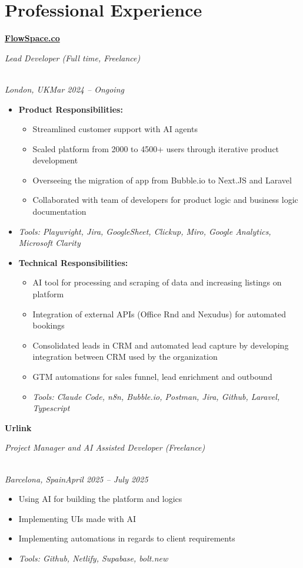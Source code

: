 \documentclass[a4paper,10pt]{article}
\newcommand{\role}[4]{\vspace{3pt}\noindent\hspace{0.6em}\parbox[t]{0.38\textwidth}{\raggedright\textbf{#1}}\hfill\parbox[t]{0.58\textwidth}{\raggedleft\textit{#2}}\\{\textit{#3}\hfill\textit{#4}}\vspace{1pt}}
\begin{document}
\section{Professional Experience}
\role{\href{https://flowspace.co}{FlowSpace.co}}{Lead Developer (Full time, Freelance)}{London, UK}{Mar 2024 -- Ongoing}
\begin{itemize}
\item \textbf{Product Responsibilities:}
\begin{itemize}[label=--]
\item Streamlined customer support with AI agents
\item Scaled platform from 2000 to 4500+ users through iterative product development
\item Overseeing the migration of app from Bubble.io to Next.JS and Laravel
\item Collaborated with team of developers for product logic and business logic documentation
\end{itemize}
\item \textit{Tools: Playwright, Jira, GoogleSheet, Clickup, Miro, Google Analytics, Microsoft Clarity}
\item \textbf{Technical Responsibilities:}
\begin{itemize}[label=--]
\item AI tool for processing and scraping of data and increasing listings on platform
\item Integration of external APIs (Office Rnd and Nexudus) for automated bookings
\item Consolidated leads in CRM and automated lead capture by developing integration between CRM used by the organization
\item GTM automations for sales funnel, lead enrichment and outbound
\item \textit{Tools: Claude Code, n8n, Bubble.io, Postman, Jira, Github, Laravel, Typescript}
\end{itemize}
\end{itemize}

\role{Urlink}{Project Manager and AI Assisted Developer (Freelance)}{Barcelona, Spain}{April 2025 -- July 2025}
\begin{itemize}
\item Using AI for building the platform and logics
\item Implementing UIs made with AI
\item Implementing automations in regards to client requirements
\item \textit{Tools: Github, Netlify, Supabase, bolt.new}
\end{itemize}
\end{document}
